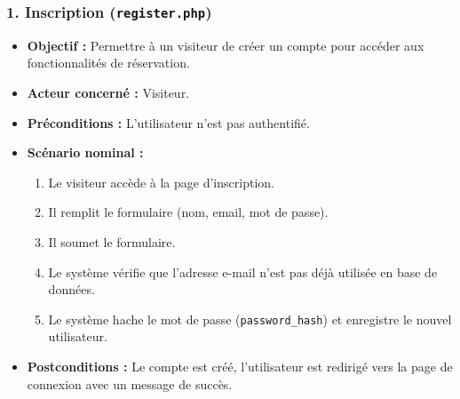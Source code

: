 \documentclass[a4paper,12pt]{article}
\begin{document}
\subsubsection*{1. Inscription (\texttt{register.php})}
\begin{itemize}[label=\textbullet]
    \item \textbf{Objectif :} Permettre à un visiteur de créer un compte pour accéder aux fonctionnalités de réservation.
    \item \textbf{Acteur concerné :} Visiteur.
    \item \textbf{Préconditions :} L'utilisateur n'est pas authentifié.
    \item \textbf{Scénario nominal :}
    \begin{enumerate}[label=\arabic*.]
        \item Le visiteur accède à la page d'inscription.
        \item Il remplit le formulaire (nom, email, mot de passe).
        \item Il soumet le formulaire.
        \item Le système vérifie que l'adresse e-mail n'est pas déjà utilisée en base de données.
        \item Le système hache le mot de passe (\texttt{password\_hash}) et enregistre le nouvel utilisateur.
    \end{enumerate}
    \item \textbf{Postconditions :} Le compte est créé, l'utilisateur est redirigé vers la page de connexion avec un message de succès.
\end{itemize}

\vspace{0.3cm}

\end{document}
